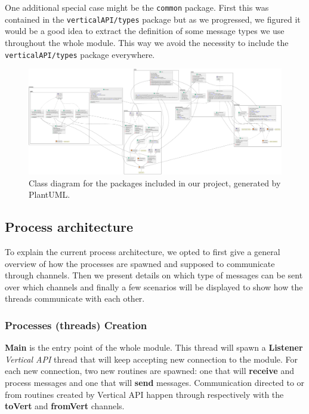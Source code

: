 \documentclass[a4paper,english,10pt,NET]{tumarticle}
\begin{document}
One additional special case might be the \texttt{common} package.
First this was contained in the \texttt{verticalAPI/types} package but as we progressed, we figured it would be a good idea to extract the definition of some message types we use throughout the whole module.
This way we avoid the necessity to include the \texttt{verticalAPI/types} package everywhere.

\begin{landscape}
	\pagestyle{empty}
	\begin{figure}
		\centering
		\hspace*{-0.1\linewidth}\includegraphics[width=1.2\linewidth]{figures/class}
		\caption{Class diagram for the packages included in our project, generated by PlantUML.}
		\label{fig:classDia}
	\end{figure}
\end{landscape}

\subsection{Process architecture}

To explain the current process architecture, we opted to first give a general overview of how the processes are spawned and supposed to communicate through channels. Then we present details on which type of messages can be sent over which channels and finally a few scenarios will be displayed to show how the threads communicate with each other.

\subsubsection{Processes (threads) Creation}

\textbf{Main} is the entry point of the whole module. This thread will spawn a \textbf{Listener} \textit{Vertical API} thread that will keep accepting new connection to the module. For each new connection, two new routines are spawned: one that will \textbf{receive} and process messages and one that will \textbf{send} messages. Communication directed to or from routines created by Vertical API happen through respectively with the \textbf{toVert} and \textbf{fromVert} channels.
\end{document}
